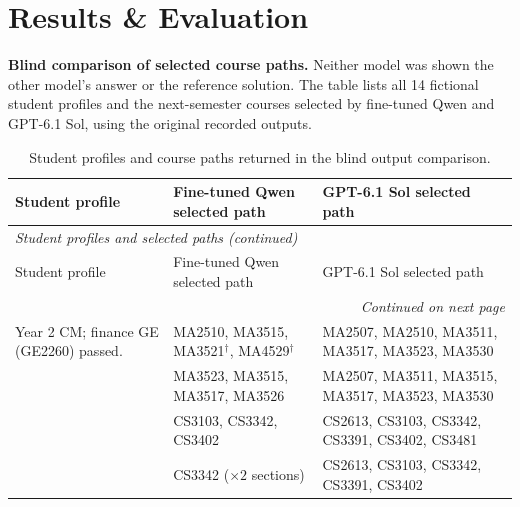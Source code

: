 \documentclass{article}
\begin{document}
\newpage
\section{Results \& Evaluation}

\textbf{Blind comparison of selected course paths.} Neither model was shown the other model's answer or the reference solution. The table lists all 14 fictional student profiles and the next-semester courses selected by fine-tuned Qwen and GPT-6.1 Sol, using the original recorded outputs.

{\small
\setlength{\tabcolsep}{4pt}
\renewcommand{\arraystretch}{1.12}
\begin{longtable}{p{1.67in}p{1.75in}p{1.75in}}
\caption{Student profiles and course paths returned in the blind output comparison.}\label{tab:paths05}\\
\toprule
Student profile & Fine-tuned Qwen selected path & GPT-6.1 Sol selected path\\
\midrule
\endfirsthead
\multicolumn{3}{l}{\textit{Student profiles and selected paths (continued)}}\\
\toprule
Student profile & Fine-tuned Qwen selected path & GPT-6.1 Sol selected path\\
\midrule
\endhead
\midrule
\multicolumn{3}{r}{\textit{Continued on next page}}\\
\endfoot
\bottomrule
\endlastfoot
{\raggedright Year 2 CM; finance GE (GE2260) passed.\par} & {\raggedright MA2510, MA3515, MA3521$^{\dagger}$, MA4529$^{\dagger}$\par} & {\raggedright MA2507, MA2510, MA3511, MA3517, MA3523, MA3530\par}\\
\addlinespace[2pt]
{\raggedright Year 2 CM; non-finance GE; Enriched Mathematics inferred.\par} & {\raggedright MA3523, MA3515, MA3517, MA3526\par} & {\raggedright MA2507, MA3511, MA3515, MA3517, MA3523, MA3530\par}\\
\addlinespace[2pt]
{\raggedright Year 2 CS; AI GE (GE2340) passed; AI interest.\par} & {\raggedright CS3103, CS3342, CS3402\par} & {\raggedright CS2613, CS3103, CS3342, CS3391, CS3402, CS3481\par}\\
\addlinespace[2pt]
{\raggedright Year 2 CS; AI interest; higher difficulty weight ($\lambda_d=20$).\par} & {\raggedright CS3342 ($\times2$ sections)\par} & {\raggedright CS2613, CS3103, CS3342, CS3391, CS3402\par}\\

\end{longtable}}
\end{document}
